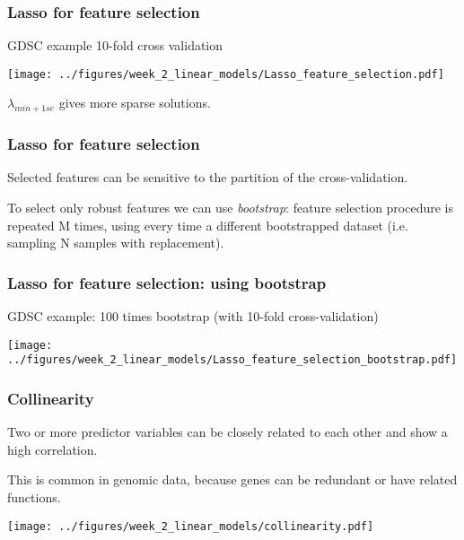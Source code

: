 \documentclass[notes]{beamer}          %
\begin{document}
\begin{frame}
\frametitle{Lasso for feature selection}
GDSC example 10-fold cross validation

\begin{center}
\texttt{[image: ../figures/week\_2\_linear\_models/Lasso\_feature\_selection.pdf]}
\end{center}

$\lambda_{min+1se}$ gives more sparse solutions.

\end{frame}


\begin{frame}
\frametitle{Lasso for feature selection}

Selected features can be sensitive to the partition of the cross-validation.

\vspace{5mm} 

To select only robust features we can use \textit{bootstrap}: feature selection procedure is repeated M times, using every time a different bootstrapped dataset (i.e. sampling N samples with replacement).

\end{frame}


\begin{frame}
\frametitle{Lasso for feature selection: using bootstrap}
GDSC example: 100 times bootstrap (with 10-fold cross-validation)

\begin{center}
\texttt{[image: ../figures/week\_2\_linear\_models/Lasso\_feature\_selection\_bootstrap.pdf]}
\end{center}

\end{frame}




\begin{frame}
\frametitle{Collinearity}
Two or more predictor variables can be closely related to each other and show a high correlation.

\vspace{5mm} 

This is common in genomic data, because genes can be redundant or have related functions.

\begin{center}
\texttt{[image: ../figures/week\_2\_linear\_models/collinearity.pdf]}
\end{center}

\end{frame}
\end{document}
